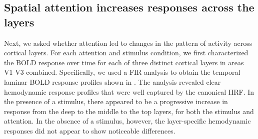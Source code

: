\documentclass[9pt,lineno]{aperture}
\begin{document}
\subsection{Spatial attention increases responses across the layers}
Next, we asked whether attention led to changes in the pattern of activity across cortical layers. For each attention and stimulus condition, we first characterized the BOLD response over time for each of three distinct cortical layers in areas V1-V3 combined. Specifically, we used a FIR analysis to obtain the temporal laminar BOLD response profiles shown in . The analysis revealed clear hemodynamic response profiles that were well captured by the canonical HRF. In the presence of a stimulus, there appeared to be a progressive increase in response from the deep to the middle to the top layers, for both the stimulus and attention. In the absence of a stimulus, however, the layer-specific hemodynamic responses did not appear to show noticeable differences.
\end{document}
